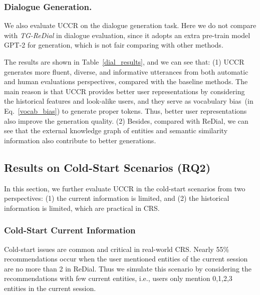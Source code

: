 \documentclass[sigconf,natbib=true]{acmart}
\begin{document}
\subsubsection{Dialogue Generation.}

We also evaluate UCCR on the dialogue generation task. Here we do not compare with \textit{TG-ReDial} in dialogue evaluation, since it adopts an extra pre-train model GPT-2 for generation, which is not fair comparing with other methods.


The results are shown in Table~\ref{dial_results}, and we can see that: (1) UCCR generates more fluent, diverse, and informative utterances from both automatic and human evaluations perspectives, compared with the baseline methods. The main reason is that UCCR provides better user representations by considering the historical features and look-alike users, and they serve as vocabulary bias~(in Eq.~\ref{vocab_bias}) to generate proper tokens. Thus, better user representations also improve the generation quality. (2) Besides, compared with ReDial, we can see that the external knowledge graph of entities and semantic similarity information also contribute to better generations.



\subsection{Results on Cold-Start Scenarios (RQ2)}

In this section, we further evaluate UCCR in the cold-start scenarios from two perspectives: (1) the current information is limited, and (2) the historical information is limited, which are practical in CRS.

\subsubsection{Cold-Start Current Information}

Cold-start issues are common and critical in real-world CRS. Nearly 55\% recommendations occur when the user mentioned entities of the current session are no more than 2 in ReDial.
Thus we simulate this scenario by considering the recommendations with few current entities, i.e., users only mention 0,1,2,3 entities in the current session.
\end{document}

